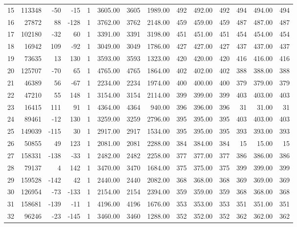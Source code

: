 \documentclass[notitlepage,a4paper]{article}\usepackage[]{graphicx}\usepackage[]{color}
\begin{document}
\begin{scriptsize}
\begin{landscape}
\begin{table}[ht]
\begin{tabular}{rrrrrrrrrrrrrr}
  15 & 113348 & -50 & -15 &   1 & 3605.00 & 3605 & 1989.00 & 492 & 492.00 & 492 & 494 & 494.00 & 494 \\ 
  16 & 27872 &  88 & -128 &   1 & 3762.00 & 3762 & 2148.00 & 459 & 459.00 & 459 & 487 & 487.00 & 487 \\ 
  17 & 102180 & -32 &  60 &   1 & 3391.00 & 3391 & 3198.00 & 451 & 451.00 & 451 & 454 & 454.00 & 454 \\ 
  18 & 16942 & 109 & -92 &   1 & 3049.00 & 3049 & 1786.00 & 427 & 427.00 & 427 & 437 & 437.00 & 437 \\ 
  19 & 73635 &  13 & 130 &   1 & 3593.00 & 3593 & 1323.00 & 420 & 420.00 & 420 & 416 & 416.00 & 416 \\ 
  20 & 125707 & -70 &  65 &   1 & 4765.00 & 4765 & 1864.00 & 402 & 402.00 & 402 & 388 & 388.00 & 388 \\ 
  21 & 46389 &  56 & -67 &   1 & 2234.00 & 2234 & 1974.00 & 400 & 400.00 & 400 & 379 & 379.00 & 379 \\ 
  22 & 47210 &  55 & 148 &   1 & 3154.00 & 3154 & 2114.00 & 399 & 399.00 & 399 & 403 & 403.00 & 403 \\ 
  23 & 16415 & 111 &  91 &   1 & 4364.00 & 4364 & 940.00 & 396 & 396.00 & 396 &  31 & 31.00 &  31 \\ 
  24 & 89461 & -12 & 130 &   1 & 3259.00 & 3259 & 2796.00 & 395 & 395.00 & 395 & 403 & 403.00 & 403 \\ 
  25 & 149039 & -115 &  30 &   1 & 2917.00 & 2917 & 1534.00 & 395 & 395.00 & 395 & 393 & 393.00 & 393 \\ 
  26 & 50855 &  49 & 123 &   1 & 2081.00 & 2081 & 2288.00 & 384 & 384.00 & 384 &  15 & 15.00 &  15 \\ 
  27 & 158331 & -138 & -33 &   1 & 2482.00 & 2482 & 2258.00 & 377 & 377.00 & 377 & 386 & 386.00 & 386 \\ 
  28 & 79137 &   4 & 142 &   1 & 3470.00 & 3470 & 1684.00 & 375 & 375.00 & 375 & 399 & 399.00 & 399 \\ 
  29 & 159528 & -142 &  42 &   1 & 2440.00 & 2440 & 2082.00 & 368 & 368.00 & 368 & 369 & 369.00 & 369 \\ 
  30 & 126954 & -73 & -133 &   1 & 2154.00 & 2154 & 2394.00 & 359 & 359.00 & 359 & 368 & 368.00 & 368 \\ 
  31 & 158681 & -139 & -11 &   1 & 4196.00 & 4196 & 1676.00 & 353 & 353.00 & 353 & 351 & 351.00 & 351 \\ 
  32 & 96246 & -23 & -145 &   1 & 3460.00 & 3460 & 1288.00 & 352 & 352.00 & 352 & 362 & 362.00 & 362 \\ 

\end{tabular}
\end{table}
\end{landscape}
\end{scriptsize}
\end{document}
